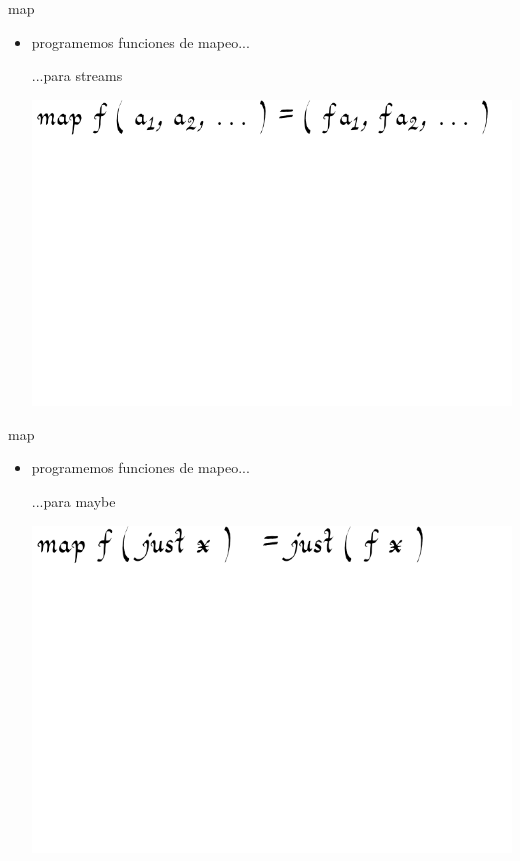 \documentclass[9pt]{beamer}
\begin{document}
\begin{frame}{map}
  \begin{itemize}
  \item programemos funciones de mapeo...
    \begin{block}{...para streams}\end{block}
    \vspace{1.2cm}
    \begin{center}\hspace{-2cm}\includegraphics[scale=0.5]{img/mapstream}\end{center}
  \end{itemize}
\end{frame}


\begin{frame}{map}
  \begin{itemize}
  \item programemos funciones de mapeo...
    \begin{block}{...para maybe}\end{block}
    \vspace{1.2cm}
    \begin{center}\hspace{-2cm}\includegraphics[scale=0.5]{img/mapmaybe}\end{center}
  \end{itemize}
\end{frame}
\end{document}
